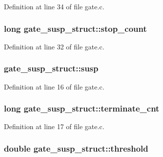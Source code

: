 Definition at line 34 of file gate.\+c.

\subsubsection[{\texorpdfstring{stop\+\_\+count}{stop_count}}]{\setlength{\rightskip}{0pt plus 5cm}long gate\+\_\+susp\+\_\+struct\+::stop\+\_\+count}\hypertarget{structgate__susp__struct_a6368a5161ac46233aafec90eb6a12b16}{}\label{structgate__susp__struct_a6368a5161ac46233aafec90eb6a12b16}


Definition at line 32 of file gate.\+c.

\subsubsection[{\texorpdfstring{susp}{susp}}]{ gate\+\_\+susp\+\_\+struct\+::susp}\hypertarget{structgate__susp__struct_a087d567afc9b82bb15f3fe848468bf59}{}\label{structgate__susp__struct_a087d567afc9b82bb15f3fe848468bf59}


Definition at line 16 of file gate.\+c.

\subsubsection[{\texorpdfstring{terminate\+\_\+cnt}{terminate_cnt}}]{\setlength{\rightskip}{0pt plus 5cm}long gate\+\_\+susp\+\_\+struct\+::terminate\+\_\+cnt}\hypertarget{structgate__susp__struct_ab9f69aa46331e3ce63c92ffeb43e794c}{}\label{structgate__susp__struct_ab9f69aa46331e3ce63c92ffeb43e794c}


Definition at line 17 of file gate.\+c.

\subsubsection[{\texorpdfstring{threshold}{threshold}}]{\setlength{\rightskip}{0pt plus 5cm}double gate\+\_\+susp\+\_\+struct\+::threshold}\hypertarget{structgate__susp__struct_a82e9c68e2ff25e46fe7ee33d8bf3b2d9}{}\label{structgate__susp__struct_a82e9c68e2ff25e46fe7ee33d8bf3b2d9}


